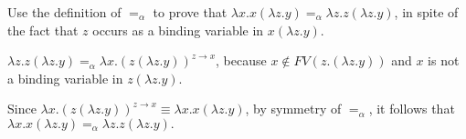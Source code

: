 \begin{problem}{1.3}
    Use the definition of $=_\alpha$ to prove that $\lambda x.x(\lambda z.y) =_\alpha \lambda z.z(\lambda z.y)$, in spite of the fact that $z$ occurs as a binding variable in $x(\lambda z.y)$.
\end{problem}

\begin{solution}
    $\lambda z.z(\lambda z.y) =_\alpha \lambda x.(z(\lambda z.y))^{z \to x}$, because $x \notin FV(z.(\lambda z.y))$ and $x$ is not a binding variable in $z(\lambda z.y)$.

    Since $\lambda x.(z(\lambda z.y))^{z \to x} \equiv \lambda x.x(\lambda z.y)$, by symmetry of $=_\alpha$, it follows that $\lambda x.x(\lambda z.y) =_\alpha \lambda z.z(\lambda z.y).$
\end{solution}